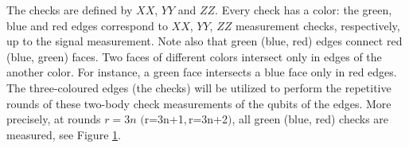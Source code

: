 \documentclass[%
reprint,
amsmath,amssymb,
aps,
]{revtex4-2}
\begin{document}
The checks are defined by $XX$, $YY$ and $ZZ$. Every check has a color: the green, blue and red edges correspond to $XX$, $YY$, $ZZ$ measurement checks, respectively, up to the signal measurement. Note also that green (blue, red) edges connect red (blue, green) faces. Two faces of different colors intersect only in edges of the another color. For instance, a green face intersects a blue face 
only in red edges. The three-coloured edges (the checks) will be utilized to perform 
the repetitive rounds of these two-body check measurements of the qubits of the edges. More precisely, at rounds $r=3n$ $($r=3n+1$, $r=3n+2$)$, all green (blue, red) checks are measured, see Figure \ref{figdouglas2}. 

\begin{figure}[H]
	\centering
	\label{figdouglas2}
\end{figure}
\end{document}
